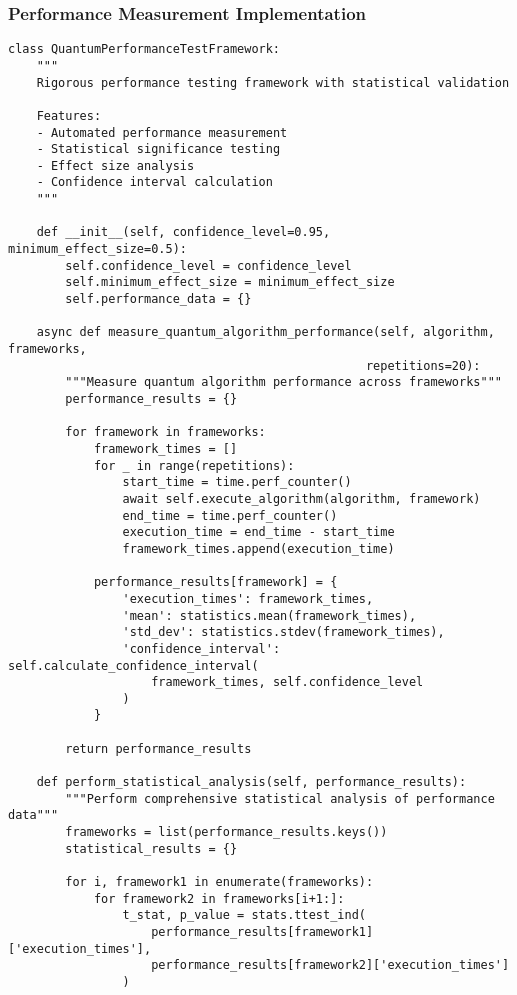 \documentclass[12pt,a4paper]{report}
\begin{document}
\subsubsection{Performance Measurement Implementation}

\begin{lstlisting}
class QuantumPerformanceTestFramework:
    """
    Rigorous performance testing framework with statistical validation

    Features:
    - Automated performance measurement
    - Statistical significance testing
    - Effect size analysis
    - Confidence interval calculation
    """

    def __init__(self, confidence_level=0.95, minimum_effect_size=0.5):
        self.confidence_level = confidence_level
        self.minimum_effect_size = minimum_effect_size
        self.performance_data = {}

    async def measure_quantum_algorithm_performance(self, algorithm, frameworks,
                                                  repetitions=20):
        """Measure quantum algorithm performance across frameworks"""
        performance_results = {}

        for framework in frameworks:
            framework_times = []
            for _ in range(repetitions):
                start_time = time.perf_counter()
                await self.execute_algorithm(algorithm, framework)
                end_time = time.perf_counter()
                execution_time = end_time - start_time
                framework_times.append(execution_time)

            performance_results[framework] = {
                'execution_times': framework_times,
                'mean': statistics.mean(framework_times),
                'std_dev': statistics.stdev(framework_times),
                'confidence_interval': self.calculate_confidence_interval(
                    framework_times, self.confidence_level
                )
            }

        return performance_results

    def perform_statistical_analysis(self, performance_results):
        """Perform comprehensive statistical analysis of performance data"""
        frameworks = list(performance_results.keys())
        statistical_results = {}

        for i, framework1 in enumerate(frameworks):
            for framework2 in frameworks[i+1:]:
                t_stat, p_value = stats.ttest_ind(
                    performance_results[framework1]['execution_times'],
                    performance_results[framework2]['execution_times']
                )


\end{lstlisting}
\end{document}

